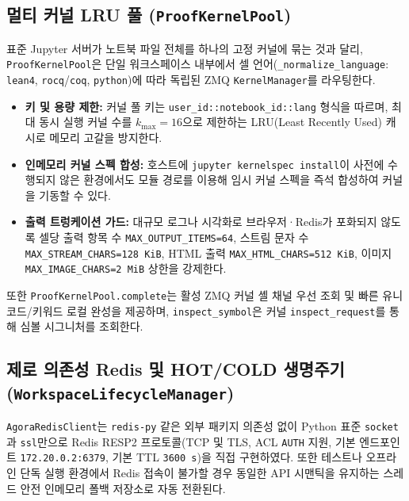 \documentclass[journal]{IEEEtran}
\newcommand{\code}[1]{\texttt{#1}}
\begin{document}
\subsection{멀티 커널 LRU 풀 (\code{ProofKernelPool})}
표준 Jupyter 서버가 노트북 파일 전체를 하나의 고정 커널에 묶는 것과 달리, \code{ProofKernelPool}은 단일 워크스페이스 내부에서 셀 언어(\code{\_normalize\_language}: \code{lean4}, \code{rocq}/\code{coq}, \code{python})에 따라 독립된 ZMQ \code{KernelManager}를 라우팅한다.
\begin{itemize}
  \item \textbf{키 및 용량 제한:} 커널 풀 키는 \code{user\_id::notebook\_id::lang} 형식을 따르며, 최대 동시 실행 커널 수를 $k_{\max} = 16$으로 제한하는 LRU(Least Recently Used) 캐시로 메모리 고갈을 방지한다.
  \item \textbf{인메모리 커널 스펙 합성:} 호스트에 \code{jupyter kernelspec install}이 사전에 수행되지 않은 환경에서도 모듈 경로를 이용해 임시 커널 스펙을 즉석 합성하여 커널을 기동할 수 있다.
  \item \textbf{출력 트렁케이션 가드:} 대규모 로그나 시각화로 브라우저·Redis가 포화되지 않도록 셀당 출력 항목 수 \code{MAX\_OUTPUT\_ITEMS=64}, 스트림 문자 수 \code{MAX\_STREAM\_CHARS=128\,KiB}, HTML 출력 \code{MAX\_HTML\_CHARS=512\,KiB}, 이미지 \code{MAX\_IMAGE\_CHARS=2\,MiB} 상한을 강제한다.
\end{itemize}
또한 \code{ProofKernelPool.complete}는 활성 ZMQ 커널 셸 채널 우선 조회 및 빠른 유니코드/키워드 로컬 완성을 제공하며, \code{inspect\_symbol}은 커널 \code{inspect\_request}를 통해 심볼 시그니처를 조회한다.

\subsection{제로 의존성 Redis 및 HOT/COLD 생명주기 (\code{WorkspaceLifecycleManager})}
\code{AgoraRedisClient}는 \code{redis-py} 같은 외부 패키지 의존성 없이 Python 표준 \code{socket}과 \code{ssl}만으로 Redis RESP2 프로토콜(TCP 및 TLS, ACL \code{AUTH} 지원, 기본 엔드포인트 \code{172.20.0.2:6379}, 기본 TTL \code{3600\,s})을 직접 구현하였다. 또한 테스트나 오프라인 단독 실행 환경에서 Redis 접속이 불가할 경우 동일한 API 시맨틱을 유지하는 스레드 안전 인메모리 폴백 저장소로 자동 전환된다.
\end{document}
